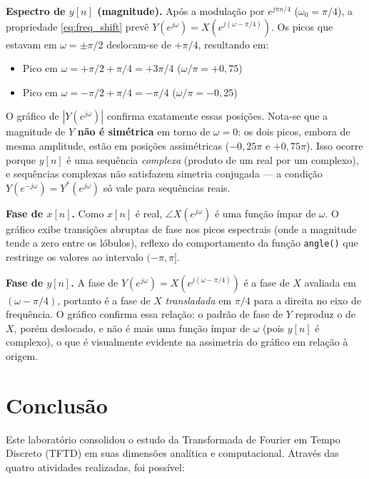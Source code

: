 \documentclass[tcc]{classe_uftex/uftex}
\begin{document}
\textbf{Espectro de $y[n]$ (magnitude).} Após a modulação por $e^{j\pi n/4}$ ($\omega_0 = \pi/4$), a propriedade \eqref{eq:freq_shift} prevê $Y(e^{j\omega}) = X(e^{j(\omega - \pi/4)})$. Os picos que estavam em $\omega = \pm\pi/2$ deslocam-se de $+\pi/4$, resultando em:
\begin{itemize}
  \item Pico em $\omega = +\pi/2 + \pi/4 = +3\pi/4$ ($\omega/\pi = +0{,}75$)
  \item Pico em $\omega = -\pi/2 + \pi/4 = -\pi/4$ ($\omega/\pi = -0{,}25$)
\end{itemize}
O gráfico de $|Y(e^{j\omega})|$ confirma exatamente essas posições. Nota-se que a magnitude de $Y$ \textbf{não é simétrica} em torno de $\omega = 0$: os dois picos, embora de mesma amplitude, estão em posições assimétricas ($-0{,}25\pi$ e $+0{,}75\pi$). Isso ocorre porque $y[n]$ é uma sequência \emph{complexa} (produto de um real por um complexo), e sequências complexas não satisfazem simetria conjugada — a condição $Y(e^{-j\omega}) = Y^*(e^{j\omega})$ só vale para sequências reais.

\textbf{Fase de $x[n]$.} Como $x[n]$ é real, $\angle X(e^{j\omega})$ é uma função ímpar de $\omega$. O gráfico exibe transições abruptas de fase nos picos espectrais (onde a magnitude tende a zero entre os lóbulos), reflexo do comportamento da função \texttt{angle()} que restringe os valores ao intervalo $(-\pi, \pi]$.

\textbf{Fase de $y[n]$.} A fase de $Y(e^{j\omega}) = X(e^{j(\omega-\pi/4)})$ é a fase de $X$ avaliada em $(\omega-\pi/4)$, portanto é a fase de $X$ \emph{transladada} em $\pi/4$ para a direita no eixo de frequência. O gráfico confirma essa relação: o padrão de fase de $Y$ reproduz o de $X$, porém deslocado, e não é mais uma função ímpar de $\omega$ (pois $y[n]$ é complexo), o que é visualmente evidente na assimetria do gráfico em relação à origem.

\chapter{Conclusão}

Este laboratório consolidou o estudo da Transformada de Fourier em Tempo Discreto (TFTD) em suas dimensões analítica e computacional. Através das quatro atividades realizadas, foi possível:
\end{document}
